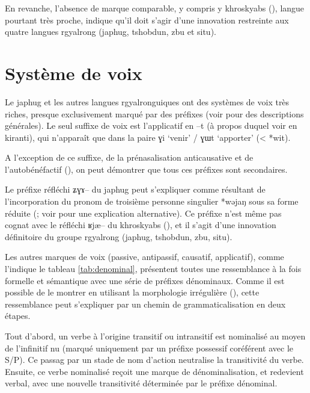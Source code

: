 \documentclass[oldfontcommands,oneside,a4paper,11pt]{article}
\newcommand{\ipa}[1]{{\phon \mbox{#1}}} %
\begin{document}
En revanche, l'absence de marque comparable, y compris y khroskyabs (\citealt{lai13affixale}), langue pourtant très proche, indique qu'il doit s'agir d'une innovation restreinte aux quatre langues rgyalrong (japhug, tshobdun, zbu et situ).

\section{Système de voix}

Le japhug et les autres langues rgyalronguiques ont des systèmes de voix très riches, presque exclusivement marqué par des préfixes (voir  \citealt{lai13affixale, jacques14antipassive, jackson14morpho} pour des descriptions générales). Le seul suffixe de voix est l'applicatif en \ipa{--t} (à propos duquel voir \citealt{michailovsky85dental, jacques15derivational.khaling} en kiranti), qui n'apparaît que dans la paire \ipa{ɣi} `venir' /  \ipa{ɣɯt} `apporter' (< *\ipa{wit}).

A l'exception de ce suffixe, de la prénasalisation anticausative et de l'autobénéfactif (\citealt{jacques12demotion, jacques15spontaneous}), on peut démontrer que tous ces préfixes sont secondaires.

Le préfixe réfléchi \ipa{ʑɣɤ--} du japhug peut s'expliquer comme résultant de l'incorporation du pronom de troisième personne singulier *\ipa{wəjaŋ} sous sa forme réduite (\citealt{jacques10refl}; voir  \citealt{jackson14morpho} pour une explication alternative). Ce préfixe n'est même pas cognat avec le réfléchi \ipa{ʁjæ--} du khroskyabs  (\citealt[156-7]{lai13affixale}), et il s'agit d'une innovation définitoire du groupe rgyalrong (japhug, tshobdun, zbu, situ).

Les autres marques de voix (passive, antipassif, causatif, applicatif), comme l'indique le tableau  \ref{tab:denominal}, présentent toutes une ressemblance à la fois formelle et sémantique avec une série de préfixes dénominaux. Comme il est possible de le montrer en utilisant la morphologie irrégulière (\citealt{jacques14antipassive}), cette ressemblance peut s'expliquer par un chemin de grammaticalisation en deux étapes. 

Tout d'abord, un verbe à l'origine transitif ou intransitif est nominalisé au moyen de l'infinitif nu (marqué uniquement par un préfixe possessif coréférent avec le S/P). Ce passag par un stade de nom d'action neutralise la transitivité du verbe. Ensuite, ce verbe nominalisé reçoit une marque de dénominalisation, et redevient verbal, avec une nouvelle transitivité déterminée par le préfixe dénominal. 
\end{document}
